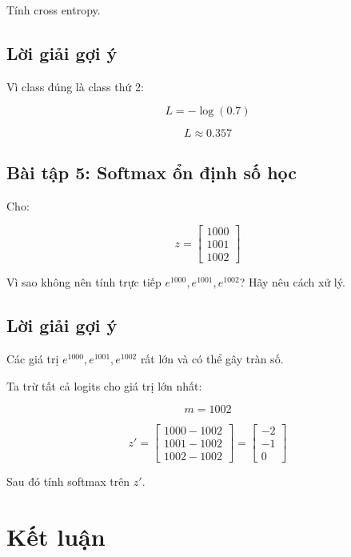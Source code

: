 \documentclass[12pt,a4paper]{report}
\begin{document}
Tính cross entropy.

\section*{Lời giải gợi ý}

Vì class đúng là class thứ 2:

\[
    L=-\log(0.7)
\]

\[
    L\approx 0.357
\]

\section*{Bài tập 5: Softmax ổn định số học}

Cho:

\[
    z =
    \begin{bmatrix}
    1000\\
    1001\\
    1002
    \end{bmatrix}
\]

Vì sao không nên tính trực tiếp $e^{1000},e^{1001},e^{1002}$? Hãy nêu cách xử lý.

\section*{Lời giải gợi ý}

Các giá trị $e^{1000},e^{1001},e^{1002}$ rất lớn và có thể gây tràn số.

Ta trừ tất cả logits cho giá trị lớn nhất:

\[
    m=1002
\]

\[
    z' =
    \begin{bmatrix}
    1000-1002\\
    1001-1002\\
    1002-1002
    \end{bmatrix}
    =
    \begin{bmatrix}
    -2\\
    -1\\
    0
    \end{bmatrix}
\]

Sau đó tính softmax trên $z'$.

\chapter*{Kết luận}
\end{document}
